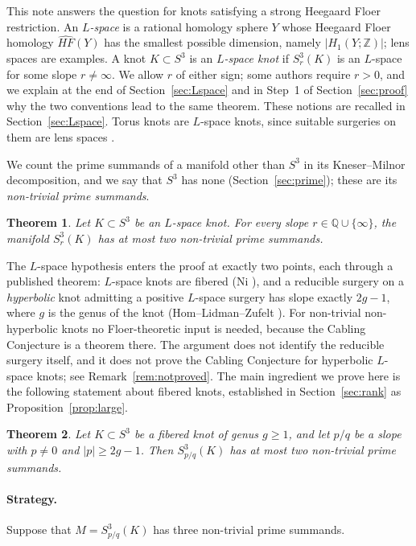 \documentclass[11pt]{article}
\newcommand{\Z}{\mathbb Z}
\newcommand{\Q}{\mathbb Q}
\newcommand{\Surg}[2]{S^3_{#1}(#2)}
\newcommand{\HFhat}{\widehat{HF}}
\newtheorem{theorem}{Theorem}[section]
\theoremstyle{definition}
\theoremstyle{remark}
\begin{document}
This note answers the question for knots satisfying a strong
Heegaard Floer restriction. An \emph{\(L\)-space} is a rational homology
sphere \(Y\) whose Heegaard Floer homology \(\HFhat(Y)\) has the smallest
possible dimension, namely \(|H_1(Y;\Z)|\); lens spaces are examples. A knot
\(K\subset S^3\) is an \emph{\(L\)-space knot} if \(\Surg{r}{K}\) is an
\(L\)-space for some slope \(r\neq\infty\). We allow \(r\) of either sign;
some authors require \(r>0\), and we explain at the end of
Section~\ref{sec:Lspace} and in Step~1 of Section~\ref{sec:proof} why the
two conventions lead to the same theorem. These notions are recalled in
Section~\ref{sec:Lspace}. Torus knots are \(L\)-space knots, since
suitable surgeries on them are lens spaces \cite{Moser1971}.

We count the prime summands of a manifold other than \(S^3\) in its
Kneser--Milnor decomposition, and we say that \(S^3\) has none
(Section~\ref{sec:prime}); these are its \emph{non-trivial prime
summands}.

\begin{theorem}\label{thm:main}
Let \(K\subset S^3\) be an \(L\)-space knot. For every slope
\(r\in\Q\cup\{\infty\}\), the manifold \(\Surg{r}{K}\) has at most two
non-trivial prime summands.
\end{theorem}

The \(L\)-space hypothesis enters the proof at exactly two points, each
through a published theorem: \(L\)-space knots are fibered (Ni
\cite{Ni2007}), and a reducible surgery on a \emph{hyperbolic} knot
admitting a positive \(L\)-space surgery has slope exactly \(2g-1\), where
\(g\) is the genus of the knot (Hom--Lidman--Zufelt \cite[Theorem~1.3]{HLZ2015}).
For non-trivial non-hyperbolic knots no Floer-theoretic input is needed,
because the Cabling Conjecture is a theorem there. The argument does not identify
the reducible surgery itself, and it does not prove the Cabling
Conjecture for hyperbolic \(L\)-space knots; see Remark~\ref{rem:notproved}.
The main ingredient we prove here is the following statement about
fibered knots, established in Section~\ref{sec:rank} as
Proposition~\ref{prop:large}.

\begin{theorem}\label{thm:fibered}
Let \(K\subset S^3\) be a fibered knot of genus \(g\geq1\), and let
\(p/q\) be a slope with \(p\neq0\) and \(|p|\geq 2g-1\). Then
\(\Surg{p/q}{K}\) has at most two non-trivial prime summands.
\end{theorem}

\paragraph{Strategy.}
Suppose that \(M=\Surg{p/q}{K}\) has three non-trivial prime summands.
\end{document}
